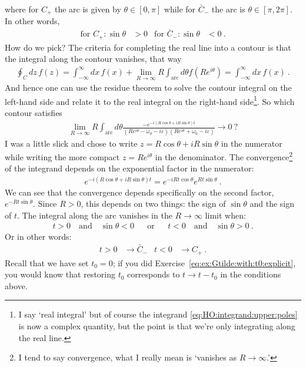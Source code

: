 where for $C_+$ the arc is given by $\theta \in [0,\pi]$ while for $\bar C_-$ the arc is $\theta\in[\pi,2\pi]$. In other words, 
\begin{align}
	\text{for $C_+$:}\, \sin\theta &> 0
	&
	\text{for $\bar C_-$:}\, \sin\theta &<0 \ .
	\label{eq:HO:which:contour}
\end{align}
%
How do we pick? The criteria for completing the real line into a contour is that the integral along the contour vanishes, that way
\begin{align}
	\oint_C dz\, f(z) 
	= \int_{-\infty}^\infty dx\, f(x) + \lim_{R\to \infty} R \int_\text{arc} d\theta f(Re^{i\theta}) 
	= \int_{-\infty}^\infty dx\, f(x) \ .
\end{align}
And hence one can use the residue theorem to solve the contour integral on the left-hand side and relate it to the real integral on the right-hand side\footnote{I say `real integral' but of course the integrand \eqref{eq:HO:integrand:upper:poles} is now a complex quantity, but the point is that we're only integrating along the real line.}. 
%
So which contour satisfies
\begin{align}
	\lim_{R\to \infty} R \int_\text{arc} d\theta 
	\frac{-e^{-i(R\cos\theta + iR\sin\theta) t}}{(Re^{i\theta} - \omega_0 - i\varepsilon)(Re^{i\theta} + \omega_0 - i\varepsilon)}
	\to 0 \ ?
\end{align}
I was a little slick and chose to write $z = R\cos\theta + iR\sin\theta$ in the numerator while writing the more compact $z=Re^{i\theta}$ in the denominator. The convergence\footnote{I tend to say convergence, what I really mean is `vanishes as $R\to \infty$.'} of the integrand depends on the exponential factor in the numerator:
\begin{align}
	e^{-i(R\cos\theta + iR\sin\theta) t} = 
	e^{-iRt\cos\theta} e^{Rt\sin\theta} \ .
\end{align}
We can see that the convergence depends specifically on the second factor, $e^{-Rt\sin\theta}$. Since $R>0$, this depends on two things: the sign of $\sin\theta$ and the sign of $t$. The integral along the arc vanishes in the $R\to\infty$ limit when:
\begin{align}
	t > 0 \quad\text{and}\quad \sin\theta < 0 &
	&\text{or}&&
	t < 0 \quad\text{and}\quad \sin\theta > 0 \ .
	\label{eq:t:gtr:less:upper:poles}
\end{align}
Or in other words:
\begin{align}
	t>0 &\to \bar C_{-} 
	&
	t<0 &\to C_+ \ .
	\label{eq:t:sign:contour:HO}
\end{align}
Recall that we have set $t_0 = 0$; if you did Exercise~\ref{eq:ex:Gtilde:with:t0:explicit}, you would know that restoring $t_0$ corresponds to $t\to t-t_0$ in the conditions above.

